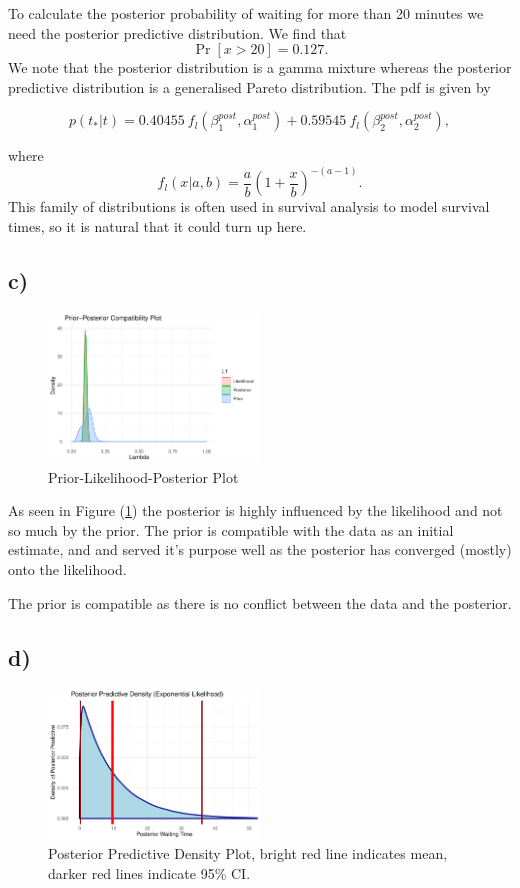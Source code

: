 \documentclass[12pt]{extarticle}
\begin{document}
To calculate the posterior probability of waiting for more than 20 minutes we need the posterior predictive distribution. We find that $$\Pr[x>20] = 0.127.$$ We note that the posterior distribution is a gamma mixture whereas the posterior predictive distribution is a generalised Pareto distribution. The pdf is given by 

\[
p(t_*|t) = 0.40455 \ f_l(\beta_1^{post}, \alpha_1^{post}) + 0.59545 \ f_l(\beta_2^{post}, \alpha_2^{post}),
\]

where 
\[
f_l(x|a,b) = \frac{a}{b}\left(1+\frac{x}{b}\right)^{-(a-1)}.
\]
This family of distributions is often used in survival analysis to model survival times, so it is natural that it could turn up here.

\subsection*{c)}
\begin{figure}[H]
	\centering
	\includegraphics[width = 0.5\textwidth]{../plpgoodnessplot}
	\caption{Prior-Likelihood-Posterior Plot}
	\label{fig:pgof}
\end{figure}

As seen in Figure (\ref{fig:pgof}) the posterior is highly influenced by the likelihood and not so much by the prior. The prior is compatible with the data as an initial estimate, and and served it's purpose well as the posterior has converged (mostly) onto the likelihood.

The prior is compatible as there is no conflict between the data and the posterior.

\subsection*{d)}
\begin{figure}[H]
	\centering
	\includegraphics[width = 0.5\textwidth]{../postpreddens}
	\caption{Posterior Predictive Density Plot, bright red line indicates mean, darker red lines indicate 95\% CI.}
	\label{fig:postpreddens}
\end{figure}
\end{document}
